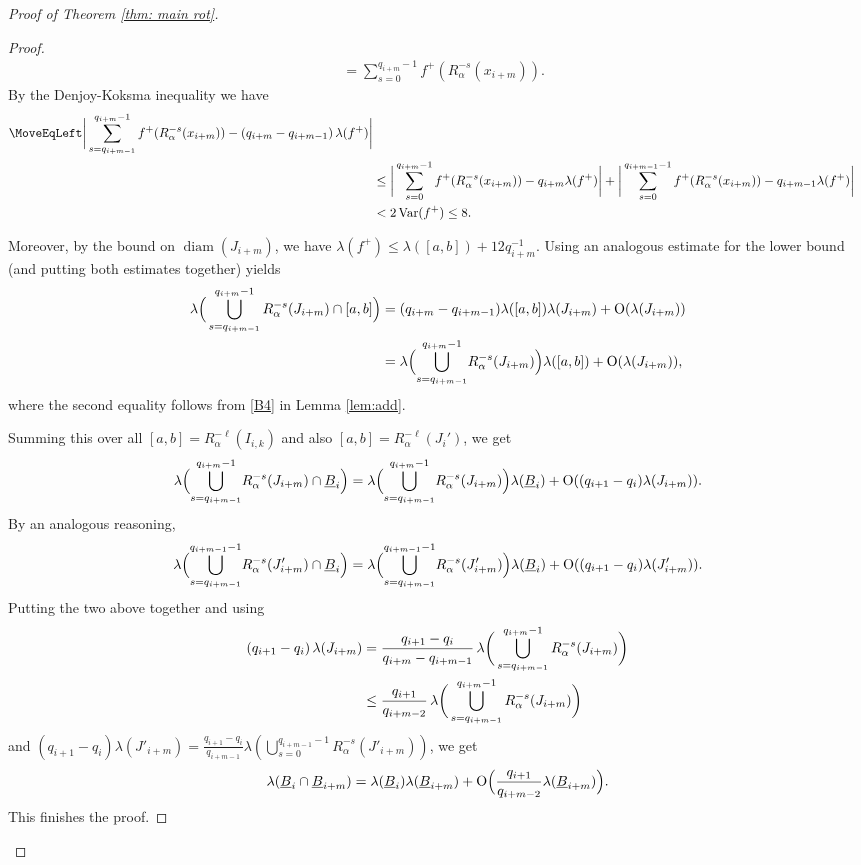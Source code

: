 \documentclass[11pt]{amsart}
\theoremstyle{definition}
\numberwithin{equation}{section}
\DeclareMathOperator{\diam}{diam}
\DeclareMathOperator{\Var}{Var}
\begin{document}
\begin{proof}[Proof of Theorem \ref{thm: main rot}]
\begin{proof}
\begin{align*}
 &= \sum_{s=0}^{q_{i+m}-1}f^+(R^{-s}_\alpha(x_{i+m})).
\end{align*}
By the Denjoy-Koksma inequality we have
\begin{align*}
 \MoveEqLeft\bigg|\sum_{s=q_{i+m-1}}^{q_{i+m}-1}f^+(R^{-s}_\alpha(x_{i+m}))- \left(q_{i+m}-q_{i+m-1}\right)\lambda(f^+)\bigg|\\
 &\leq \bigg|\sum_{s=0}^{q_{i+m}-1}f^+(R^{-s}_\alpha(x_{i+m}))- q_{i+m}\lambda(f^+)\bigg|
 +\bigg|\sum_{s=0}^{q_{i+m-1}-1}f^+(R^{-s}_\alpha(x_{i+m}))- q_{i+m-1}\lambda(f^+)\bigg|\\
 &<2\Var(f^+)\leq 8.
\end{align*}

Moreover, by the bound on $\diam(J_{i+m})$, we have $\lambda(f^+)\leq \lambda([a,b])+ 12 q_{i+m}^{-1}$. Using an analogous estimate for the lower bound (and putting both estimates together) yields
\begin{align*}
 \lambda\Big(\bigcup_{ s=q_{i+m-1}}^{q_{i+m}-1}R^{-s}_\alpha(J_{i+m})\cap [a,b]\Big)
 &={ \left(q_{i+m}-q_{i+m-1}\right)}\lambda([a,b])\lambda(J_{i+m})+{\rm O}(\lambda(J_{i+m}))\\
 &= \lambda\Big({ \bigcup_{s=q_{i+m-1}}^{q_{i+m}-1}}R^{-s}_\alpha(J_{i+m})\Big)\lambda([a,b])+{\rm O}(\lambda(J_{i+m})),
\end{align*}
where the second equality follows from \ref{B4} in Lemma \ref{lem:add}.

Summing this over all $[a,b]=R_{\alpha}^{-\ell} (I_{i,k})$ and also $[a,b]=R_\alpha^{-\ell}(J_{i}')$, we get 
$$
\lambda\Big({\bigcup_{s=q_{i+m-1}}^{q_{i+m}-1}}R^{-s}_\alpha(J_{i+m})\cap \underline{B}_i\Big)
=\lambda\Big({ \bigcup_{s=q_{i+m-1}}^{q_{i+m}-1}}R^{-s}_\alpha(J_{i+m})\Big)\lambda( \underline{B}_i)+{\rm O}({\left(q_{i+1}-q_i\right)}\lambda(J_{i+m})).
$$
By an analogous reasoning,  
$$
\lambda\Big({ \bigcup_{s=q_{i+m-1}}^{q_{i+m-1}-1}}R^{-s}_\alpha(J'_{i+m})\cap \underline{B}_i\Big)=\lambda\Big({ \bigcup_{s=q_{i+m-1}}^{q_{i+m-1}-1}}R^{-s}_\alpha(J'_{i+m})\Big)\lambda( \underline{B}_i)+{\rm O}({\left(q_{i+1}-q_i\right)}\lambda(J'_{i+m})).
$$
Putting the two above together and using \begin{align}
 \left(q_{i+1}-q_i\right)\lambda(J_{i+m})
 &= \frac{q_{i+1}-q_i}{q_{i+m}-q_{i+m-1}}\,\lambda\bigg(\bigcup_{s=q_{i+m-1}}^{q_{i+m}-1}R^{-s}_\alpha(J_{i+m})\bigg)\notag\\
 &\leq \frac{q_{i+1}}{q_{i+m-2}}\,\lambda\bigg(\bigcup_{s=q_{i+m-1}}^{q_{i+m}-1}R^{-s}_\alpha(J_{i+m})\bigg)\label{eq: qi lambdaJi}
\end{align}
and ${ (q_{i+1}-q_i)}\lambda(J'_{i+m})= \frac{ q_{i+1}-q_i}{q_{i+m-1}}\lambda(\bigcup_{s=0}^{q_{i+m-1}-1}R^{-s}_\alpha(J'_{i+m}))$,
we get 
$$
\lambda(\underline{B}_i\cap \underline{B}_{i+m})= \lambda(\underline{B}_i)\lambda(\underline{B}_{i+m})+{\rm O}\Big(\frac{q_{i+1}}{ q_{i+m-2}}\lambda(\underline{B}_{i+m})\Big).
$$
This finishes the proof.
\end{proof}





\end{proof}
\end{document}
